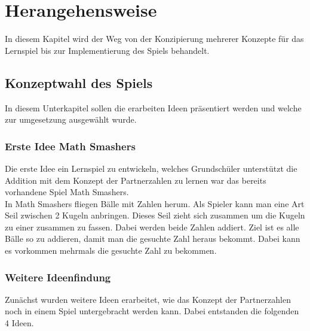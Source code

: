 %
\chapter{Herangehensweise}
In diesem Kapitel wird der Weg von der Konzipierung mehrerer Konzepte für das Lernspiel bis zur Implementierung des Spiels behandelt.
\section{Konzeptwahl des Spiels}
In diesem Unterkapitel sollen die erarbeiten Ideen präsentiert werden und welche zur umgesetzung ausgewählt wurde.
\subsection{Erste Idee Math Smashers} %
Die erste Idee ein Lernspiel zu entwickeln, welches Grundschüler unterstützt die Addition mit dem Konzept der Partnerzahlen zu lernen war das bereits vorhandene Spiel Math Smashers.\\
In Math Smashers fliegen Bälle mit Zahlen herum. Als Spieler kann man eine Art Seil zwischen 2 Kugeln anbringen. Dieses Seil zieht sich zusammen um die Kugeln zu einer zusammen zu fassen. Dabei werden beide Zahlen addiert. Ziel ist es alle Bälle so zu addieren, damit man die gesuchte Zahl heraus bekommt. Dabei kann es vorkommen mehrmals die gesuchte Zahl zu bekommen.


\subsection{Weitere Ideenfindung}
Zunächst wurden weitere Ideen erarbeitet, wie das Konzept der Partnerzahlen noch in einem Spiel untergebracht werden kann. Dabei entstanden die folgenden 4 Ideen.
